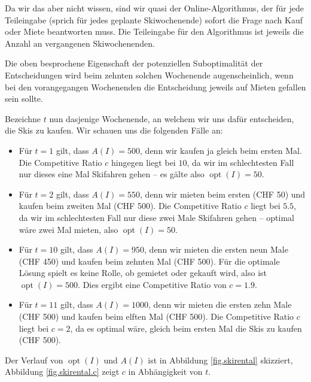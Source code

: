 \documentclass[11pt]{scrreprt} %
\theoremstyle{definition}
\begin{document}
\bigskip
Da wir das aber nicht wissen, sind wir quasi der Online-Algorithmus, der für jede Teileingabe (sprich für jedes geplante Skiwochenende) sofort die Frage nach Kauf oder Miete beantworten muss. Die Teileingabe für den Algorithmus ist jeweils die Anzahl an vergangenen Skiwochenenden.

Die oben besprochene Eigenschaft der potenziellen Suboptimalität der Entscheidungen wird beim zehnten solchen Wochenende augenscheinlich, wenn bei den vorangegangen Wochenenden die Entscheidung jeweils auf Mieten gefallen sein sollte.

\bigskip
Bezeichne $t$ nun dasjenige Wochenende, an welchem wir uns dafür entscheiden, die Skis zu kaufen. Wir schauen uns die folgenden Fälle an:

\begin{itemize}
\item Für $t = 1$ gilt, dass $A(I) = 500$, denn wir kaufen ja gleich beim ersten Mal. Die Competitive Ratio $c$ hingegen liegt bei $10$, da wir im schlechtesten Fall nur dieses eine Mal Skifahren gehen -- es gälte also $\operatorname{opt}(I) = 50$.

\item Für $t = 2$ gilt, dass $A(I) = 550$, denn wir mieten beim ersten (CHF 50) und kaufen beim zweiten Mal (CHF 500). Die Competitive Ratio $c$ liegt bei $5.5$, da wir im schlechtesten Fall nur diese zwei Male Skifahren gehen -- optimal wäre zwei Mal mieten, also  $\operatorname{opt}(I) = 50$.

\item Für $t = 10$ gilt, dass $A(I) = 950$, denn wir mieten die ersten neun Male (CHF 450) und kaufen beim zehnten Mal (CHF 500). Für die optimale Lösung spielt es keine Rolle, ob gemietet oder gekauft wird, also ist $\operatorname{opt}(I) = 500$. Dies ergibt eine Competitive Ratio von $c = 1.9$.

\item Für $t = 11$ gilt, dass $A(I) = 1000$, denn wir mieten die ersten zehn Male (CHF 500) und kaufen beim elften Mal (CHF 500). Die Competitive Ratio $c$ liegt bei $c = 2$, da es optimal wäre, gleich beim ersten Mal die Skis zu kaufen (CHF 500).
\end{itemize}

Der Verlauf von $\operatorname{opt}(I)$ und $A(I)$ ist in Abbildung \ref{fig.skirental} skizziert, Abbildung \ref{fig.skirental.c} zeigt $c$ in Abhängigkeit von $t$.
\end{document}
